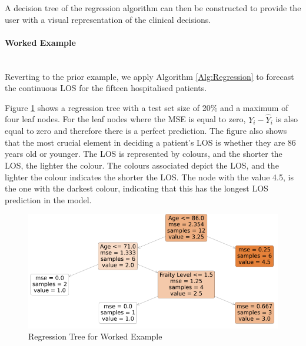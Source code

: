 \documentclass[../thesis.tex]{subfiles}
\begin{document}
A decision tree of the regression algorithm can then be constructed to provide the user with a visual representation of the clinical decisions.

\paragraph{Worked Example}\\
Reverting to the prior example, we apply Algorithm \ref{Alg:Regression} to forecast the continuous LOS for the fifteen hospitalised patients. 

Figure \ref{fig:RegTree1} shows a regression tree with a test set size of 20\% and a maximum of four leaf nodes. For the leaf nodes where the MSE is equal to zero, $Y_{i} - \hat Y_{i}$ is also equal to zero and therefore there is a perfect prediction. The figure also shows that the most crucial element in deciding a patient's LOS is whether they are 86 years old or younger. The LOS is represented by colours, and the shorter the LOS, the lighter the colour. The colours associated depict the LOS, and the lighter the colour indicates the shorter the LOS. The node with the value 4.5, is the one with the darkest colour, indicating that this has the longest LOS prediction in the model.

\begin{figure}
    \centering
    \includegraphics[scale = 0.8]{Chapters/Chapter3New/Figures/RegTree1.png}
    \caption{Regression Tree for Worked Example}
    \label{fig:RegTree1}
\end{figure}

\end{document}
